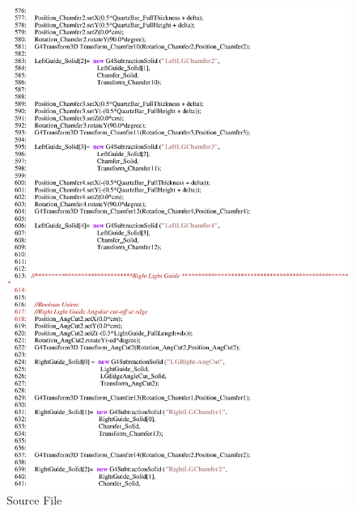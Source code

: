 \begin{figure}[ht]
  \hspace{0cm}
  \includegraphics[scale=0.8]{./figures5/QweakSimCerenkovDetector.cc-p10.eps}
  \caption{Source File}
           \label{fig:V-SC-14}
\end{figure}
\clearpage

